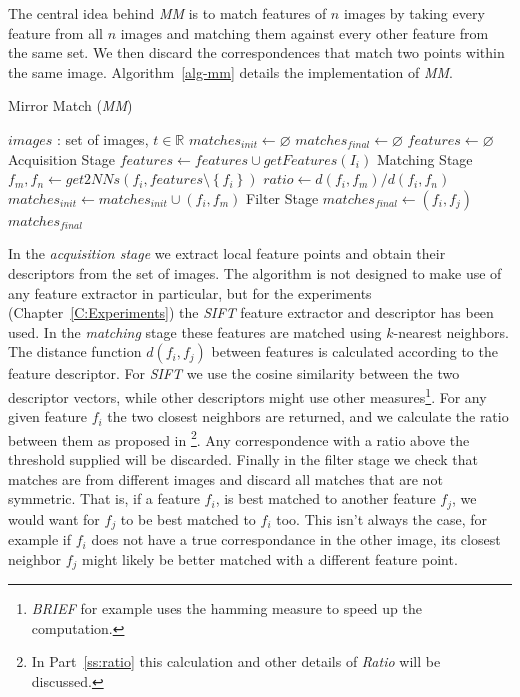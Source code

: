 The central idea behind \emph{MM} is to match features of $n$ images by 
taking every feature from all $n$ images and matching them against every 
other feature from the same set. We then discard the correspondences 
that match two points within the same image. Algorithm~\ref{alg-mm} 
details the implementation of \emph{MM}.

\begin{algorithm}[htb]
\caption{Mirror Match (\emph{MM})}
\label{alg-mm}
\begin{algorithmic}
\Require $images$ : set of images, $t \in \mathbb{R}$
\State $matches_{init}\gets \varnothing$
\State $matches_{final}\gets \varnothing$
\State $features\gets \varnothing$
 \Comment Acquisition Stage
	\State $features\gets features \cup getFeatures(I_i)$
\EndFor
{} \Comment Matching Stage
	\State $f_m,f_n \gets get2NNs(f_i, features \setminus 
	\left\{f_i\right\})$
    \State $ratio \gets d(f_i, f_m) / d(f_i, f_n)$
		\State $matches_{init} \gets matches_{init} \cup \left(f_i, f_m\right)$
	\EndIf
\EndFor
{} \Comment Filter 
Stage
		\State $matches_{final} \gets (f_i, f_j)$
	\EndIf
\EndFor \\
\Return $matches_{final}$
\end{algorithmic}
\end{algorithm}

In the \emph{acquisition stage} we extract local feature points and 
obtain their descriptors from the set of images. The algorithm is not 
designed to make use of any feature extractor in particular, but for the
experiments (Chapter~\ref{C:Experiments}) the \emph{SIFT} feature 
extractor and descriptor has been used. In the \emph{matching} stage 
these features are matched using $k$-nearest neighbors.  The distance 
function $d(f_i, f_j)$ between features is calculated according to the 
feature descriptor. For \emph{SIFT} we use the cosine similarity between 
the two descriptor vectors, while other descriptors might use other 
measures\footnote{\emph{BRIEF} for example uses the hamming measure to 
speed up the computation.}.  For any given feature $f_i$ the two closest 
neighbors are returned, and we calculate the ratio between them as 
proposed in \cite{lowe2004sift}\footnote{In Part~\ref{ss:ratio} this 
calculation and other details of \emph{Ratio} will be discussed.}.  Any 
correspondence with a ratio above the threshold supplied will be 
discarded. Finally in the filter stage we check that matches are from 
different images and discard all matches that are not symmetric. That 
is, if a feature $f_i$, is best matched to another feature $f_j$, we 
would want for $f_j$ to be best matched to $f_i$ too.
This isn't always the case, for example if $f_i$ does not have a true 
correspondance in the other image, its closest neighbor $f_j$ might 
likely be better matched with a different feature point.

